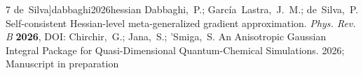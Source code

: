 \documentclass[journal=jctcce,manuscript=article]{achemso}
\begin{document}
\begin{mcitethebibliography}{7}
  de~Silva]{dabbaghi2026hessian}
Dabbaghi,~P.; Garc{\'i}a~Lastra,~J.~M.; de~Silva,~P. Self-consistent
  Hessian-level meta-generalized gradient approximation. \emph{Phys. Rev. B}
  \textbf{2026}, DOI: \relax
\mciteBstWouldAddEndPuncttrue
\mciteSetBstMidEndSepPunct{\mcitedefaultmidpunct}
{\mcitedefaultendpunct}{\mcitedefaultseppunct}\relax
\EndOfBibitem
{}
Chirchir,~G.; Jana,~S.; {'S}miga,~S. An Anisotropic Gaussian Integral Package
  for Quasi-Dimensional Quantum-Chemical Simulations. 2026; Manuscript in
  preparation\relax
\mciteBstWouldAddEndPuncttrue
\mciteSetBstMidEndSepPunct{\mcitedefaultmidpunct}
{\mcitedefaultendpunct}{\mcitedefaultseppunct}\relax
\EndOfBibitem
\end{mcitethebibliography}
\end{document}
